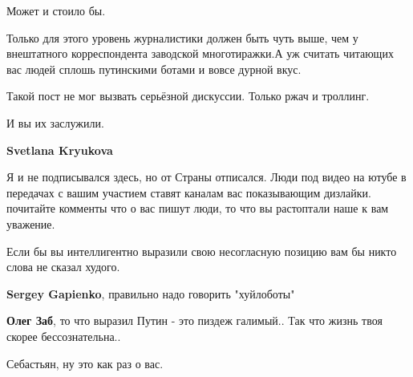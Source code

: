 \begin{itemize}
\begin{itemize}
Может и стоило бы.

Только для этого уровень журналистики должен быть чуть выше, чем у внештатного
корреспондента заводской многотиражки.А уж считать читающих вас людей сплошь
путинскими ботами и вовсе дурной вкус.

Такой пост не мог вызвать серьёзной дискуссии. Только ржач и троллинг.

И вы их заслужили.


 
\textbf{Svetlana Kryukova} 

Я и не подписывался здесь, но от Страны отписался. Люди под видео на ютубе в
передачах с вашим участием ставят каналам вас показывающим дизлайки. почитайте
комменты что о вас пишут люди, то что вы растоптали наше к вам уважение. 

Если бы вы интеллигентно выразили свою несогласную позицию вам бы никто слова
не сказал худого.

 
\textbf{Sergey Gapienko}, правильно надо говорить "хуйлоботы"

 
\textbf{Олег Заб}, то что выразил Путин - это пиздеж галимый.. Так что жизнь твоя скорее бессознательна..

 
Себастьян, ну это как раз о вас.

 

\end{itemize}
\end{itemize}
